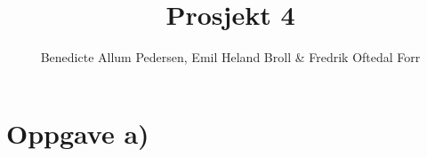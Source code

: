 \documentclass{article}
\title{Prosjekt 4}\vspace{-3ex}
\author{Benedicte Allum Pedersen, Emil Heland Broll & Fredrik Oftedal Forr}
\date{\vspace{-5ex}}
\begin{document}
\maketitle

\section*{Oppgave a)}
\end{document}
